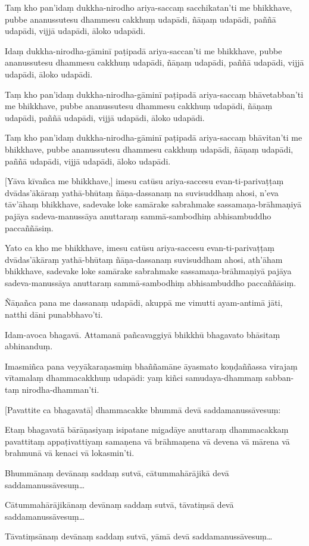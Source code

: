 Taṃ kho pan'idaṃ dukkha-nirodho ariya-saccaṃ sacchikatan'ti me bhikkhave,
pubbe ananussutesu dhammesu cakkhuṃ udapādi, ñāṇaṃ udapādi, paññā
udapādi, vijjā udapādi, āloko udapādi.

Idaṃ dukkha-nirodha-gāminī paṭipadā ariya-saccan'ti me bhikkhave, pubbe
ananussutesu dhammesu cakkhuṃ udapādi, ñāṇaṃ udapādi, paññā udapādi,
vijjā udapādi, āloko udapādi.

Taṃ kho pan'idaṃ dukkha-nirodha-gāminī paṭipadā ariya-saccaṃ bhāvetabban'ti
me bhikkhave, pubbe ananussutesu dhammesu cakkhuṃ udapādi, ñāṇaṃ
udapādi, paññā udapādi, vijjā udapādi, āloko udapādi.

Taṃ kho pan'idaṃ dukkha-nirodha-gāminī paṭipadā ariya-saccaṃ bhāvitan'ti me
bhikkhave, pubbe ananussutesu dhammesu cakkhuṃ udapādi, ñāṇaṃ udapādi,
paññā udapādi, vijjā udapādi, āloko udapādi.

[Yāva kīvañca me bhikkhave,] imesu catūsu ariya-saccesu evan-ti-parivaṭṭaṃ
dvādas'ākāraṃ yathā-bhūtaṃ ñāṇa-dassanaṃ na suvisuddhaṃ ahosi, n'eva tāv'āhaṃ
bhikkhave, sadevake loke samārake sabrahmake sassamaṇa-brāhmaṇiyā pajāya
sadeva-manussāya anuttaraṃ sammā-sambodhiṃ abhisambuddho paccaññāsiṃ.

Yato ca kho me bhikkhave, imesu catūsu ariya-saccesu evan-ti-parivaṭṭaṃ
dvādas'ākāraṃ yathā-bhūtaṃ ñāṇa-dassanaṃ suvisuddham ahosi, ath'āham
bhikkhave, sadevake loke samārake sabrahmake sassamaṇa-brāhmaṇiyā pajāya
sadeva-manussāya anuttaraṃ sammā-sambodhiṃ abhisambuddho paccaññāsiṃ.

Ñāṇañca pana me dassanaṃ udapādi, akuppā me vimutti ayam-antimā jāti,
natthi dāni punabbhavo'ti.

Idam-avoca bhagavā. Attamanā pañcavaggiyā bhikkhū bhagavato bhāsitaṃ
abhinanduṃ.

Imasmiñca pana veyyākaraṇasmiṃ bhaññamāne āyasmato koṇḍaññassa virajaṃ
vītamalaṃ dhammacakkhuṃ udapādi: yaṃ kiñci samudaya-dhammaṃ sabban-taṃ
nirodha-dhamman'ti.

[Pavattite ca bhagavatā] dhammacakke bhummā devā saddamanussāvesuṃ:

Etaṃ bhagavatā bārāṇasiyaṃ isipatane migadāye anuttaraṃ dhammacakkaṃ
pavattitaṃ appaṭivattiyaṃ samaṇena vā brāhmaṇena vā devena vā mārena vā
brahmunā vā kenaci vā lokasmin'ti.

Bhummānaṃ devānaṃ saddaṃ sutvā, cātummahārājikā devā
saddamanussāvesuṃ\ldots

Cātummahārājikānaṃ devānaṃ saddaṃ sutvā, tāvatiṃsā devā
saddamanussāvesuṃ\ldots

Tāvatiṃsānaṃ devānaṃ saddaṃ sutvā, yāmā devā saddamanussāvesuṃ\ldots

